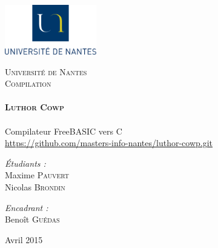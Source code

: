 \begin{titlepage}
 
	 \includegraphics[width=4cm]{figures/UN.png}~\\[1cm]
	\begin{center}
    \textsc{\LARGE Université de Nantes}\\[2cm]

    \textsc{\Large Compilation}\\[2cm]

    \HRule \\[0.4cm]
    { \huge \bfseries \textsc{Luthor Cowp}\\[0.4cm] }
    \HRule \\[2cm]
    
    {\LARGE Compilateur FreeBASIC vers C} 
    \\[1cm]
    \href{https://github.com/masters-info-nantes/luthor-cowp.git}{https://github.com/masters-info-nantes/luthor-cowp.git}
	\\[5cm]

    \begin{minipage}{0.4\textwidth}
      \large
        \emph{\'Etudiants :}\\
        Maxime \textsc{Pauvert}\\
        Nicolas \textsc{Brondin}
    \end{minipage}
    \begin{minipage}{0.4\textwidth}
      \large
        \emph{Encadrant :}\\
         Benoît \textsc{Guédas}\\
    \end{minipage}

    \vfill

    {\large Avril 2015}

  \end{center}
\end{titlepage}
